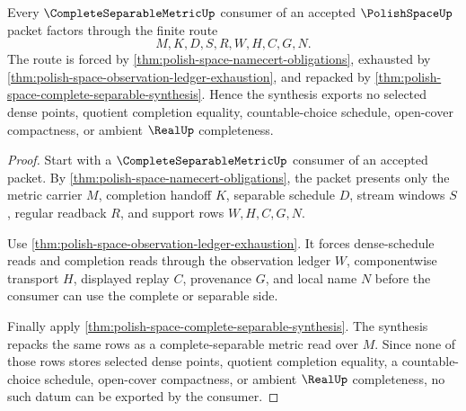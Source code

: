 \begin{theorem}
\label{thm:polish-space-complete-separable-nonescape}
Every $\CompleteSeparableMetricUp$ consumer of an accepted $\PolishSpaceUp$ packet factors through the finite route
$$
M,K,D,S,R,W,H,C,G,N.
$$
The route is forced by \autoref{thm:polish-space-namecert-obligations}, exhausted by \autoref{thm:polish-space-observation-ledger-exhaustion}, and repacked by \autoref{thm:polish-space-complete-separable-synthesis}. Hence the synthesis exports no selected dense points, quotient completion equality, countable-choice schedule, open-cover compactness, or ambient $\RealUp$ completeness.
\end{theorem}
\begin{proof}
Start with a $\CompleteSeparableMetricUp$ consumer of an accepted packet. By \autoref{thm:polish-space-namecert-obligations}, the packet presents only the metric carrier $M$, completion handoff $K$, separable schedule $D$, stream windows $S$, regular readback $R$, and support rows $W,H,C,G,N$.

Use \autoref{thm:polish-space-observation-ledger-exhaustion}. It forces dense-schedule reads and completion reads through the observation ledger $W$, componentwise transport $H$, displayed replay $C$, provenance $G$, and local name $N$ before the consumer can use the complete or separable side.

Finally apply \autoref{thm:polish-space-complete-separable-synthesis}. The synthesis repacks the same rows as a complete-separable metric read over $M$. Since none of those rows stores selected dense points, quotient completion equality, a countable-choice schedule, open-cover compactness, or ambient $\RealUp$ completeness, no such datum can be exported by the consumer.
\end{proof}

